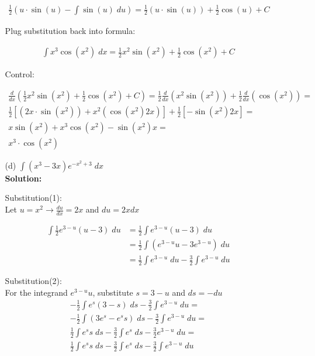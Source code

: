 \documentclass[a4paper]{article}
\begin{document}
\begin{enumerate}
\begin{enumerate}
\begin{center}
\end{center}

\begin{align*}
\frac{1}{2} (u \cdot \sin(u) - \int \sin(u) \; du) = \frac{1}{2}(u \cdot \sin(u)) + \frac{1}{2} \cos(u) + C
\end{align*}

Plug substitution back into formula:

\begin{align*}
\int x^3 \cos(x^2) \; dx = \frac{1}{2}x^2 \sin(x^2) + \frac{1}{2} \cos(x^2) + C
\end{align*}

Control:

\begin{align*}
\frac{d}{dx}(\frac{1}{2}x^2 \sin(x^2) + \frac{1}{2} \cos(x^2) + C) = \frac{1}{2}\frac{d}{dx}(x^2\sin(x^2)) + \frac{1}{2}\frac{d}{dx}(\cos(x^2)) =\\
\frac{1}{2}[(2x \cdot \sin(x^2)) + x^2 (\cos(x^2)2x)] + \frac{1}{2}[-\sin(x^2)2x] =\\
x\sin(x^2) + x^3 \cos(x^2) - \sin(x^2)x =\\
x^3 \cdot \cos(x^2)
\end{align*}


	
	\item[(d)] $\int (x^3 - 3x)e^{-x^2+3} \; dx$\\
	\textbf{Solution:}
	
Substitution(1):\\

Let $u = x^2 \rightarrow \frac{du}{dx} = 2x$ and $du = 2xdx$

\begin{align*}
	\int \frac{1}{2} e^{3-u}(u-3)\; du &= \frac{1}{2} \int e^{3-u}(u-3) \; du\\
	&= \frac{1}{2} \int (e^{3-u}u - 3e^{3-u}) \; du\\
	&= \frac{1}{2} \int e^{3-u} \; du - \frac{3}{2} \int e^{3-u} \; du
\end{align*}	
	
Substitution(2):\\	
	
For the integrand $e^{3-u}u$, substitute $s = 3 - u$ and $ds = -du$\\

\begin{align*}
-\frac{1}{2} \int e^s (3-s) \; ds - \frac{3}{2} \int e^{3-u} \; du =\\
- \frac{1}{2} \int (3 e^s - e^s s) \; ds - \frac{3}{2} \int e^{3-u} \; du = \\
\frac{1}{2} \int e^s s \; ds - \frac{3}{2} \int e^s \; ds - \frac{3}{2} e^{3 - u} \; du = \\
\frac{1}{2} \int e^s s \; ds - \frac{3}{2} \int e^s \; ds - \frac{3}{2} \int e^{3-u} \; du
\end{align*}	
	

\end{enumerate}
\end{enumerate}
\end{document}
